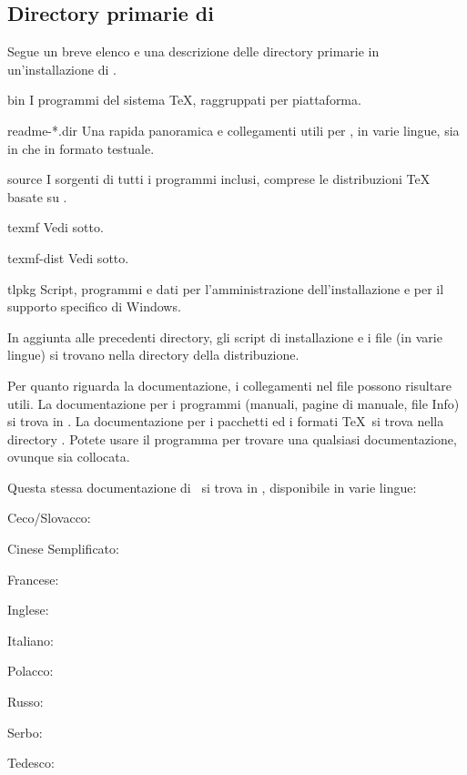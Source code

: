 \documentclass{article}
\begin{document}
\subsection{Directory primarie di \TL{}}
\label{sec:tld}

Segue un breve elenco e una descrizione delle directory primarie in
un'installazione di \TL.

\begin{ttdescription}
\item[bin] I programmi del sistema \TeX{}, raggruppati per piattaforma.
%
\item[readme-*.dir] Una rapida panoramica e collegamenti utili per \TL{},
  in varie lingue, sia in \HTML{} che in formato testuale.
%
\item[source] I sorgenti di tutti i programmi inclusi, comprese le
  distribuzioni \TeX{} basate su \Webc{}.
%
\item[texmf] Vedi  sotto.
%
\item[texmf-dist] Vedi  sotto.
%
\item[tlpkg] Script, programmi e dati per l'amministrazione
  dell'installazione e per il supporto specifico di Windows.
\end{ttdescription}

In aggiunta alle precedenti directory, gli script di installazione e i
file  (in varie lingue) si trovano nella directory della
distribuzione.

Per quanto riguarda la documentazione, i collegamenti nel file
 possono risultare utili. La documentazione per i programmi
(manuali, pagine di manuale, file Info) si trova in .
La documentazione per i pacchetti ed i formati \TeX\ si trova nella
directory . Potete usare il programma
 per trovare una qualsiasi documentazione, ovunque sia
collocata.

Questa stessa documentazione di \TL\ si trova in
, disponibile in varie lingue:

\begin{itemize*}
\item{Ceco/Slovacco:} 
\item{Cinese Semplificato:} 
\item{Francese:} 
\item{Inglese:} 
\item{Italiano:} 
\item{Polacco:} 
\item{Russo:} 
\item{Serbo:} 
\item{Tedesco:} 
\end{itemize*}
\end{document}
